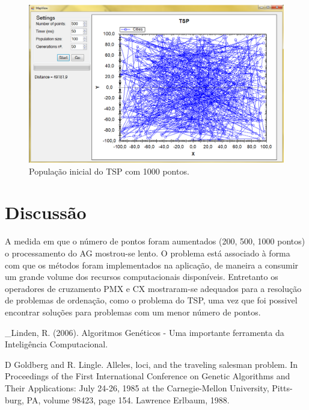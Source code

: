 \documentclass[twoside]{article}
\begin{document}
\begin{multicols}{2}
\begin{figure}[H]
\label{fig:tspa}
  \caption{População inicial do TSP com 1000 pontos.}
  \centering
    \includegraphics[scale = 0.25]{prog_tsp_a.png}
\end{figure}



\section{Discussão}
A medida em que o número de pontos foram aumentados (200, 500, 1000 pontos) o processamento do AG mostrou-se lento. O problema está associado à forma com que os métodos foram implementados na aplicação, de maneira a consumir um grande volume dos recursos computacionais disponíveis. Entretanto os operadores de cruzamento PMX e CX mostraram-se adequados para a resolução de problemas de ordenação, como o problema do TSP, uma vez que foi possivel encontrar soluções para problemas com um menor número de pontos. 

\begin{thebibliography}{99} %

\bibitem _Linden, R. (2006).  Algoritmos Genéticos - Uma importante ferramenta da Inteligência Computacional.

\bibitem D Goldberg and R. Lingle. Alleles, loci, and the traveling salesman problem. In Proceedings of the First International Conference on Genetic Algorithms and Their Applications: July 24-26, 1985 at the Carnegie-Mellon University, Pitts-burg, PA, volume 98423, page 154. Lawrence Erlbaum, 1988.
 

\end{thebibliography}
\end{multicols}
\end{document}
